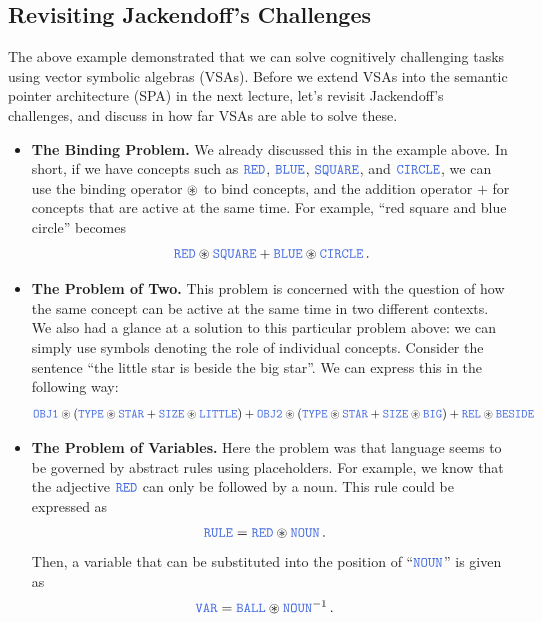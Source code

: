 \documentclass[10pt,letterpaper,oneside]{article}
\begin{document}
\subsection{Revisiting Jackendoff's Challenges}

The above example demonstrated that we can solve cognitively challenging tasks using vector symbolic algebras (VSAs). Before we extend VSAs into the semantic pointer architecture (SPA) in the next lecture, let's revisit Jackendoff's challenges, and discuss in how far VSAs are able to solve these.

\begin{itemize}
	\item \textbf{The Binding Problem.} We already discussed this in the example above. In short, if we have concepts such as $\Obj{RED}$, $\Obj{BLUE}$, $\Obj{SQUARE}$, and $\Obj{CIRCLE}$, we can use the binding operator $\circledast$ to bind concepts, and the addition operator $+$ for concepts that are active at the same time. For example, \enquote{red square and blue circle} becomes
	\begin{align*}
		\Obj{RED} \CC \Obj{SQUARE} + \Obj{BLUE} \CC \Obj{CIRCLE} \,.
	\end{align*}
	\item \textbf{The Problem of Two.} This problem is concerned with the question of how the same concept can be active at the same time in two different contexts. We also had a glance at a solution to this particular problem above: we can simply use symbols denoting the role of individual concepts. Consider the sentence \enquote{the little star is beside the big star}. We can express this in the following way:
	\begin{align*}
		\Obj{OBJ1} \CC (\Obj{TYPE} \CC \Obj{STAR} + \Obj{SIZE} \CC \Obj{LITTLE}) + \Obj{OBJ2} \CC (\Obj{TYPE} \CC \Obj{STAR} + \Obj{SIZE} \CC \Obj{BIG}) + \Obj{REL} \CC \Obj{BESIDE}
	\end{align*}
	\item \textbf{The Problem of Variables.} Here the problem was that language seems to be governed by abstract rules using placeholders. For example, we know that the adjective $\Obj{RED}$ can only be followed by a noun. This rule could be expressed as
	\begin{align*}
		\Obj{RULE} &= \Obj{RED} \CC \Obj{NOUN} \,.
	\end{align*}
	Then, a variable that can be substituted into the position of \enquote{$\Obj{NOUN}$} is given as
	\begin{align*}
		\Obj{VAR} &= \Obj{BALL} \CC \Obj{NOUN}^{-1} \,.

\end{align*}
\end{itemize}
\end{document}
